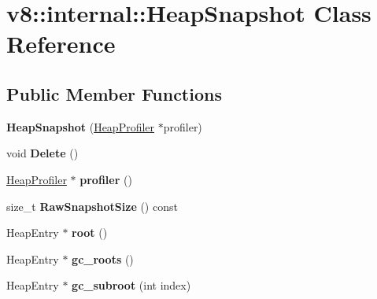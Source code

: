 \hypertarget{classv8_1_1internal_1_1_heap_snapshot}{}\section{v8\+:\+:internal\+:\+:Heap\+Snapshot Class Reference}
\label{classv8_1_1internal_1_1_heap_snapshot}
\subsection*{Public Member Functions}
\begin{DoxyCompactItemize}
\item 
{\bfseries Heap\+Snapshot} (\hyperlink{classv8_1_1internal_1_1_heap_profiler}{Heap\+Profiler} $\ast$profiler)\hypertarget{classv8_1_1internal_1_1_heap_snapshot_ae9a20fbe788ade1a582bdd9fc9245ee9}{}\label{classv8_1_1internal_1_1_heap_snapshot_ae9a20fbe788ade1a582bdd9fc9245ee9}

\item 
void {\bfseries Delete} ()\hypertarget{classv8_1_1internal_1_1_heap_snapshot_a92b437132b6ad4bafb6bd8edd5815554}{}\label{classv8_1_1internal_1_1_heap_snapshot_a92b437132b6ad4bafb6bd8edd5815554}

\item 
\hyperlink{classv8_1_1internal_1_1_heap_profiler}{Heap\+Profiler} $\ast$ {\bfseries profiler} ()\hypertarget{classv8_1_1internal_1_1_heap_snapshot_a21abc3ddeb0e56eff5e0059ef45921e1}{}\label{classv8_1_1internal_1_1_heap_snapshot_a21abc3ddeb0e56eff5e0059ef45921e1}

\item 
size\+\_\+t {\bfseries Raw\+Snapshot\+Size} () const \hypertarget{classv8_1_1internal_1_1_heap_snapshot_a05be198159baab66122b65c25622e1d4}{}\label{classv8_1_1internal_1_1_heap_snapshot_a05be198159baab66122b65c25622e1d4}

\item 
Heap\+Entry $\ast$ {\bfseries root} ()\hypertarget{classv8_1_1internal_1_1_heap_snapshot_af1eccb69f8d539b6fe95afc6c2038319}{}\label{classv8_1_1internal_1_1_heap_snapshot_af1eccb69f8d539b6fe95afc6c2038319}

\item 
Heap\+Entry $\ast$ {\bfseries gc\+\_\+roots} ()\hypertarget{classv8_1_1internal_1_1_heap_snapshot_aa85f48da92de18a6e9eeb1097a80b4e3}{}\label{classv8_1_1internal_1_1_heap_snapshot_aa85f48da92de18a6e9eeb1097a80b4e3}

\item 
Heap\+Entry $\ast$ {\bfseries gc\+\_\+subroot} (int index)\hypertarget{classv8_1_1internal_1_1_heap_snapshot_ad9e130b78fcc810d3835752c1d069069}{}\label{classv8_1_1internal_1_1_heap_snapshot_ad9e130b78fcc810d3835752c1d069069}


\end{DoxyCompactItemize}
